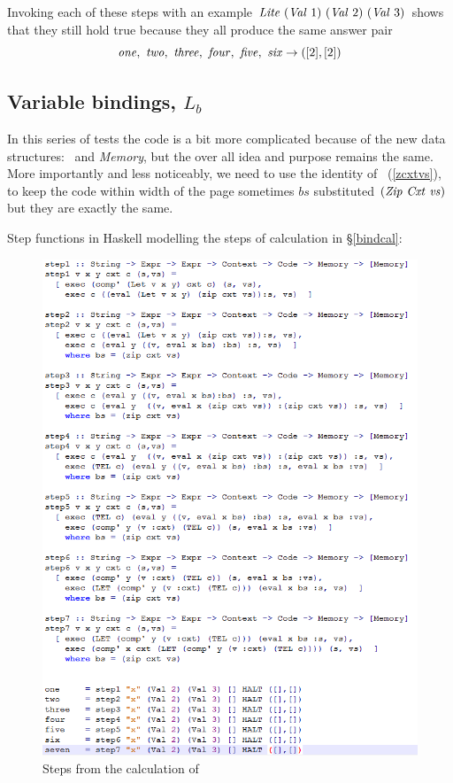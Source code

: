 \documentclass {article}
\begin{document}
Invoking each of these steps
with an example 
\( \mathit{Lite\ } (\mathit{Val\ } 1)\ (\mathit{Val\ } 2)\ (\mathit{Val\ } 3) \)
shows that they still hold true
because they all produce the same answer pair
\begin{equation*}
\mathit{one,\ two,\ three,\ four,\ five,\ six } 
		\rightarrow ([2], [2]) \\
\end{equation*}

\subsection{Variable bindings, $L_b$}

In this series of tests the code is a bit more
complicated because of the new data structures:
\Cxtt\ and \textit{Memory}, but the over all
idea and purpose remains the same. More importantly
and less noticeably, we need to use the identity
of \zip\ (\ref{zcxtvs}), to keep the code within
width of the page sometimes $bs$ substituted
$(\mathit{Zip\ } \mathit{Cxt\ } \mathit{vs})$ but they are exactly the same.

Step functions in Haskell modelling the
steps of calculation in \S\ref{bindcal}:
\begin{figure}[h]
\includegraphics[scale=0.8]{Letsteps}
\caption{Steps from the calculation of \leet}
\label{figlet}
\end{figure}
\end{document}
